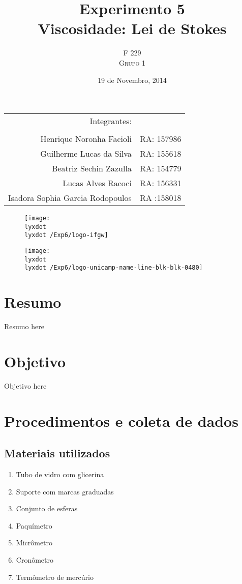 \documentclass[english,brazil]{article}
\title{Experimento 5  \\ Viscosidade: Lei de Stokes } %
\author{F 229 \\ \textsc{Grupo 1}}
\date{19 de Novembro, 2014}
\providecommand{\tabularnewline}{\\}
\newcommand{\lyxdot}{.}
\providecommand{\tabularnewline}{\\}
\begin{document}
\maketitle



\begin{center}
	\begin{tabular}{rr}
	                    Integrantes:  & \tabularnewline
	                                  & \tabularnewline
	        Henrique Noronha Facioli  & RA: 157986 \tabularnewline
	        Guilherme Lucas da Silva  & RA: 155618 \tabularnewline
	          Beatriz Sechin Zazulla  & RA: 154779 \tabularnewline
	              Lucas Alves Racoci  & RA: 156331 \tabularnewline
	Isadora Sophia Garcia Rodopoulos  & RA :158018 \tabularnewline
	\end{tabular}
\par\end{center}



\begin{figure}[!ht]
	\begin{centering}
		\texttt{[image: \\lyxdot \\lyxdot /Exp6/logo-ifgw]} 
	\par\end{centering}
	\vspace*{1cm}
	\centering{}
		\texttt{[image: \\lyxdot \\lyxdot /Exp6/logo-unicamp-name-line-blk-blk-0480]} 
\end{figure}


\newpage{}


\section{Resumo}

	Resumo here

\section{Objetivo}

	Objetivo here

\section{Procedimentos e coleta de dados}


\subsection{Materiais utilizados}
	\begin{enumerate}
		\item Tubo de vidro com glicerina
		\item Suporte com marcas graduadas
		\item Conjunto de esferas
		\item Paquímetro 
		\item Micrômetro
		\item Cronômetro
		\item Termômetro de mercúrio
	\end{enumerate}
\end{document}
